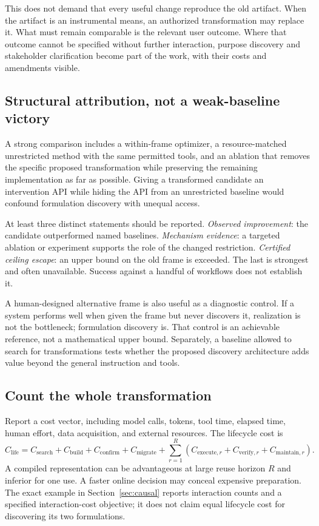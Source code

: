 \documentclass[11pt,letterpaper]{article}
\theoremstyle{remark}\newtheorem{remark}{Remark}[section]
\begin{document}
This does not demand that every useful change reproduce the old artifact. When the artifact is an instrumental means, an authorized transformation may replace it. What must remain comparable is the relevant user outcome. Where that outcome cannot be specified without further interaction, purpose discovery and stakeholder clarification become part of the work, with their costs and amendments visible.

\subsection{Structural attribution, not a weak-baseline victory}
A strong comparison includes a within-frame optimizer, a resource-matched unrestricted method with the same permitted tools, and an ablation that removes the specific proposed transformation while preserving the remaining implementation as far as possible. Giving a transformed candidate an intervention API while hiding the API from an unrestricted baseline would confound formulation discovery with unequal access.

At least three distinct statements should be reported. \emph{Observed improvement}: the candidate outperformed named baselines. \emph{Mechanism evidence}: a targeted ablation or experiment supports the role of the changed restriction. \emph{Certified ceiling escape}: an upper bound on the old frame is exceeded. The last is strongest and often unavailable. Success against a handful of workflows does not establish it.

A human-designed alternative frame is also useful as a diagnostic control. If a system performs well when given the frame but never discovers it, realization is not the bottleneck; formulation discovery is. That control is an achievable reference, not a mathematical upper bound. Separately, a baseline allowed to search for transformations tests whether the proposed discovery architecture adds value beyond the general instruction and tools.

\subsection{Count the whole transformation}
Report a cost vector, including model calls, tokens, tool time, elapsed time, human effort, data acquisition, and external resources. The lifecycle cost is
\begin{equation}
C_{\mathrm{life}}=C_{\mathrm{search}}+C_{\mathrm{build}}+C_{\mathrm{confirm}}+C_{\mathrm{migrate}}
+\sum_{r=1}^{R}(C_{\mathrm{execute},r}+C_{\mathrm{verify},r}+C_{\mathrm{maintain},r}).\label{eq:cost}
\end{equation}
A compiled representation can be advantageous at large reuse horizon $R$ and inferior for one use. A faster online decision may conceal expensive preparation. The exact example in Section~\ref{sec:causal} reports interaction counts and a specified interaction-cost objective; it does not claim equal lifecycle cost for discovering its two formulations.
\end{document}

